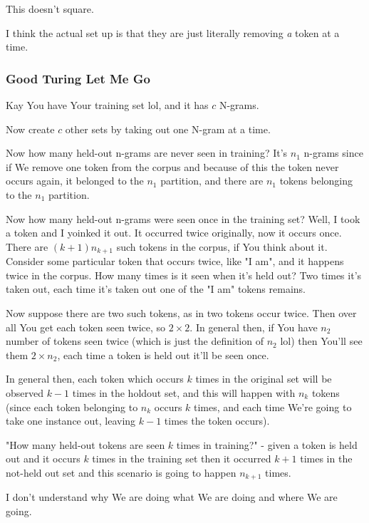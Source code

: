 \documentclass{article}
\begin{document}
			This doesn't square.
			
			I think the actual set up is that they are just literally removing \textit{a} token at a time.
			
		\subsubsection{Good Turing Let Me Go}
		
			Kay You have Your training set lol, and it has $c$ N-grams.
			
			Now create $c$ other sets by taking out one N-gram at a time.
			
			Now how many held-out n-grams are never seen in training? It's $n_1$ n-grams since if We remove one token from the corpus and because of this the token never occurs again, it belonged to the $n_1$ partition, and there are $n_1$ tokens belonging to the $n_1$ partition.
			
			Now how many held-out n-grams were seen once in the training set? Well, I took a token and I yoinked it out. It occurred twice originally, now it occurs once. There are $(k+1)n_{k+1}$ such tokens in the corpus, if You think about it. Consider some particular token that occurs twice, like "I am", and it happens twice in the corpus. How many times is it seen when it's held out? Two times it's taken out, each time it's taken out one of the "I am" tokens remains.
			
			Now suppose there are two such tokens, as in two tokens occur twice. Then over all You get each token seen twice, so $2\times 2$. In general then, if You have $n_2$ number of tokens seen twice (which is just the definition of $n_2$ lol) then You'll see them $2\times n_2$, each time a token is held out it'll be seen once.
			
			In general then, each token which occurs $k$ times in the original set will be observed $k-1$ times in the holdout set, and this will happen with $n_k$ tokens (since each token belonging to $n_k$ occurs $k$ times, and each time We're going to take one instance out, leaving $k-1$ times the token occurs).
			
			"How many held-out tokens are seen $k$ times in training?" - given a token is held out and it occurs $k$ times in the training set then it occurred $k+1$ times in the not-held out set and this scenario is going to happen $n_{k+1}$ times.
			
			I don't understand why We are doing what We are doing and where We are going.
			
\end{document}
